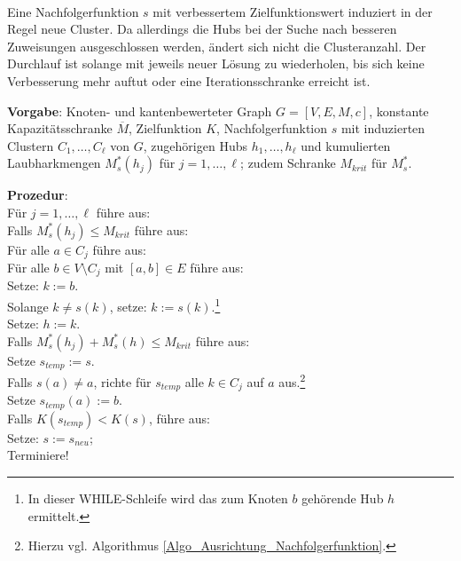 \phantom \\
\noindent Eine Nachfolgerfunktion $s$ mit verbessertem Zielfunktionswert induziert in der Regel neue Cluster. Da allerdings die Hubs bei der Suche nach besseren Zuweisungen ausgeschlossen werden, ändert sich nicht die Clusteranzahl. Der Durchlauf ist solange mit jeweils neuer Lösung zu wiederholen, bis sich keine Verbesserung mehr auftut oder eine Iterationsschranke erreicht ist.\\


\begin{algo}
\label{Algo_Clustervereinigung}
\textbf{Vorgabe}: Knoten- und kantenbewerteter Graph $G=[V,E,M,c]$, konstante Kapazitätsschranke $\overline{M}$, Zielfunktion $K$, Nachfolgerfunktion $s$ mit induzierten Clustern $C_1,\dots,C_{\ell}$ von $G$, zugehörigen Hubs $h_1,\dots,h_{\ell}$ und kumulierten Laubharkmengen $M^*_s(h_j)$ für $j=1,\dots,\ell$; zudem Schranke $M_{krit}$ für $M^*_s$.

\noindent 
\textbf{Prozedur}:\\
\phantom \quad Für $j=1,\dots,\ell$ führe aus:\\
\phantom \quad \qquad Falls $M^*_s(h_j) \leq M_{krit}$ führe aus:\\
\phantom \quad  \qquad \qquad Für alle $a \in C_j$ führe aus:\\
\phantom \quad  \qquad \qquad \qquad Für alle $b\in V\setminus C_j$ mit $[a,b] \in E$ führe aus:\\
\phantom \quad  \qquad \qquad \qquad \qquad Setze: $k := b$.\\
\phantom \quad  \qquad \qquad \qquad \qquad Solange $k \neq s(k)$, setze: $k := s(k)$.\footnote{In dieser WHILE-Schleife wird das zum Knoten $b$ gehörende Hub $h$ ermittelt.}\\
\phantom \quad  \qquad \qquad \qquad \qquad Setze: $h := k$.\\
\phantom \quad  \qquad \qquad \qquad \qquad Falls $M^*_s(h_j)+M^*_s(h) \leq M_{krit}$ führe aus:\\
\phantom \quad  \qquad \qquad \qquad \qquad \qquad Setze $s_{temp} := s$.\\
\phantom \quad  \qquad \qquad \qquad \qquad \qquad Falls $s(a) \neq a$, richte für $s_{temp}$ alle $k \in C_j$ auf $a$ aus.\footnote{Hierzu vgl. Algorithmus \ref{Algo_Ausrichtung_Nachfolgerfunktion}.}\\
\phantom \quad  \qquad \qquad \qquad \qquad \qquad Setze $s_{temp}(a) := b$.\\
\phantom \quad  \qquad \qquad \qquad \qquad \qquad Falls $K(s_{temp}) < K(s)$, führe aus:\\
\phantom \quad  \qquad \qquad \qquad \qquad \qquad \qquad Setze: $s := s_{neu}$;\\
\phantom \quad  \qquad \qquad \qquad \qquad \qquad \qquad Terminiere!
\end{algo}

